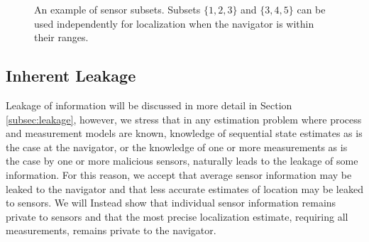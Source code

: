 \documentclass[10pt,letterpaper,oneside,twocolumn,journal]{IEEEtran}
\theoremstyle{definition}
\theoremstyle{definition}
\theoremstyle{remark}
\begin{document}
\begin{figure}[htbp]
\caption{An example of sensor subsets. Subsets $\{1,2,3\}$ and $\{3,4,5\}$ can be used independently for localization when the navigator is within their ranges.}
\label{fig:sensor_subsets}
\end{figure}

% 
% 

\subsection{Inherent Leakage}
Leakage of information will be discussed in more detail in Section \ref{subsec:leakage}, however, we stress that in any estimation problem where process and measurement models are known, knowledge of sequential state estimates as is the case at the navigator, or the knowledge of one or more measurements as is the case by one or more malicious sensors, naturally leads to the leakage of some information. For this reason, we accept that average sensor information may be leaked to the navigator and that less accurate estimates of location may be leaked to sensors. We will Instead show that individual sensor information remains private to sensors and that the most precise localization estimate, requiring all measurements, remains private to the navigator. 
\end{document}

